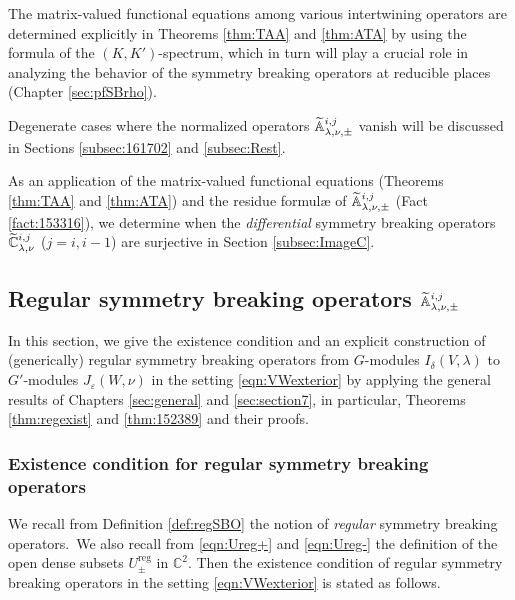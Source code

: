 The matrix-valued functional equations 
 among various intertwining operators are determined explicitly 
 in Theorems \ref{thm:TAA} and \ref{thm:ATA}
 by using the formula of the $(K,K')$-spectrum, 
 which in turn will play a crucial role in analyzing the behavior
 of the symmetry breaking operators
 at reducible places
 (Chapter \ref{sec:pfSBrho}).  



Degenerate cases where the normalized operators ${\widetilde{\mathbb{A}}}_{{\lambda},{\nu},{\pm}}^{{i,j}}$ 
 vanish will be discussed in Sections \ref{subsec:161702} and \ref{subsec:Rest}.


As an application of the matrix-valued functional 
equations (Theorems \ref{thm:TAA} and \ref{thm:ATA})
 and the residue formul{\ae}
 of ${\widetilde{\mathbb{A}}}_{{\lambda},{\nu},{\pm}}^{{i,j}}$
 (Fact \ref{fact:153316}), 
 we determine when the {\it{differential}}
 symmetry breaking operators
 $\widetilde{{\mathbb{C}}}_{{\lambda},{\nu}}^{{i,j}}$
 ($j=i,i-1$)
 are surjective in Section \ref{subsec:ImageC}.  

\subsection{Regular symmetry breaking operators ${\widetilde{\mathbb{A}}}_{{\lambda},{\nu},{\pm}}^{{i,j}}$}
\label{subsec:Aij}
In this section,
 we give the existence condition
 and an explicit construction
 of (generically) regular symmetry breaking operators from 
 $G$-modules $I_{\delta}(V,\lambda)$
 to $G'$-modules $J_{\varepsilon}(W,\nu)$
 in the setting \eqref{eqn:VWexterior}
 by applying the general results
 of Chapters \ref{sec:general} and \ref{sec:section7}, 
 in particular,  
 Theorems \ref{thm:regexist} and \ref{thm:152389}
 and their proofs.  

\subsubsection{Existence condition for regular symmetry breaking operators}
\label{subsec:reg}
We recall from Definition \ref{def:regSBO}
 the notion of {\it{regular}} symmetry breaking operators.~We also recall from \eqref{eqn:Ureg+} and \eqref{eqn:Ureg-}
 the definition of the open dense subsets
 $U_{\pm}^{\operatorname{reg}}$ in ${\mathbb{C}}^2$.  
Then the existence condition of regular symmetry breaking operators
 in the setting \eqref{eqn:VWexterior} is stated as follows.  


